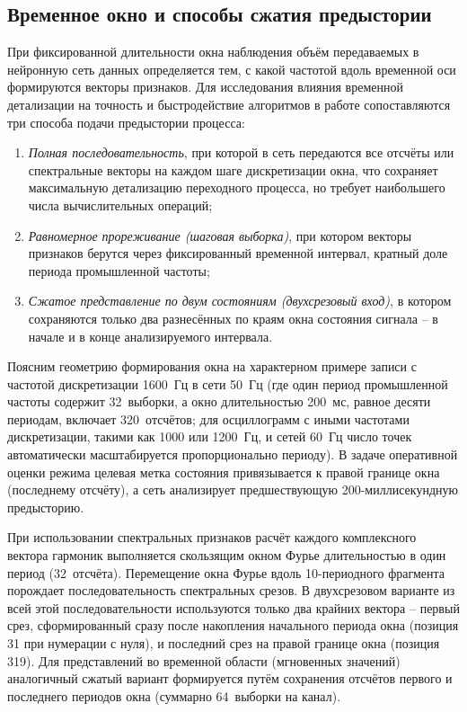 \subsection{Временное окно и способы сжатия предыстории}
\label{sec:ch4_feature_history}

При фиксированной длительности окна наблюдения объём передаваемых в
нейронную сеть данных определяется тем, с какой частотой вдоль временной
оси формируются векторы признаков. Для исследования влияния временной
детализации на точность и быстродействие алгоритмов в работе
сопоставляются три способа подачи предыстории процесса:
\begin{enumerate}
    \item \textit{Полная последовательность}, при которой в сеть передаются
    все отсчёты или спектральные векторы на каждом шаге дискретизации окна,
    что сохраняет максимальную детализацию переходного процесса, но требует
    наибольшего числа вычислительных операций;
    \item \textit{Равномерное прореживание (шаговая выборка)}, при котором
    векторы признаков берутся через фиксированный временной интервал,
    кратный доле периода промышленной частоты;
    \item \textit{Сжатое представление по двум состояниям (двухсрезовый
    вход)}, в котором сохраняются только два разнесённых по краям окна
    состояния сигнала -- в начале и в конце анализируемого интервала.
\end{enumerate}

Поясним геометрию формирования окна на характерном примере записи с
частотой дискретизации 1600~Гц в сети 50~Гц (где один период промышленной
частоты содержит 32~выборки, а окно длительностью 200~мс, равное десяти
периодам, включает 320~отсчётов; для осциллограмм с иными частотами
дискретизации, такими как 1000 или 1200~Гц, и сетей 60~Гц число точек
автоматически масштабируется пропорционально периоду). В задаче
оперативной оценки режима целевая метка состояния привязывается к правой
границе окна (последнему отсчёту), а сеть анализирует предшествующую
200-миллисекундную предысторию.

При использовании спектральных признаков расчёт каждого комплексного
вектора гармоник выполняется скользящим окном Фурье длительностью в один
период (32~отсчёта). Перемещение окна Фурье вдоль 10-периодного фрагмента
порождает последовательность спектральных срезов. В двухсрезовом варианте
из всей этой последовательности используются только два крайних вектора --
первый срез, сформированный сразу после накопления начального периода окна
(позиция 31 при нумерации с нуля), и последний срез на правой границе
окна (позиция 319). Для представлений во временной области (мгновенных
значений) аналогичный сжатый вариант формируется путём сохранения
отсчётов первого и последнего периодов окна (суммарно 64~выборки на
канал).


